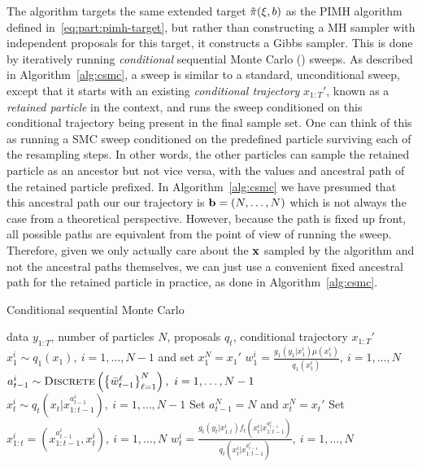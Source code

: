The \pg algorithm targets the same extended target $\tilde{\pi}(\mathbf{\xi},b)$ as the PIMH algorithm defined
in~\eqref{eq:part:pimh-target}, but rather than constructing a MH sampler with independent proposals for
this target, it constructs a Gibbs sampler.  This is done by iteratively 
running \emph{conditional} sequential Monte Carlo (\csmc) sweeps. As described in Algorithm~\ref{alg:csmc},
a \csmc sweep is similar to a standard, unconditional \smc sweep, except that it starts
with an existing \emph{conditional trajectory} $x_{1:T}'$, known as a \emph{retained particle} in the \pg
context, and runs the sweep conditioned on this conditional trajectory being present in the final sample
set.  One can think of this as running a SMC sweep conditioned on the predefined particle surviving each
of the resampling steps.  In other words, the other particles can sample the retained particle as an
ancestor but not vice versa, with the values and ancestral path of the retained particle prefixed. 
 In Algorithm~\ref{alg:csmc} we have
presumed  that this ancestral path our our trajectory is $\mathbf{b} = (N,\dots,N)$ which is not always the case from a theoretical
perspective.  However, because the path is fixed up front, all possible paths are equivalent from the point
of view of running the sweep.  Therefore,
given we only actually care about the $\mathbf{x}$ sampled by the algorithm and not the ancestral paths themselves,
we can just use a convenient fixed ancestral path for the retained particle in practice, as done in Algorithm~\ref{alg:csmc}.
\begin{algorithm}[tb]
	\caption{Conditional sequential Monte Carlo}
	\label{alg:csmc}
	\begin{spacing}{1.2}
		\begin{algorithmic}[1]
			\renewcommand{\algorithmicrequire}{\textbf{Inputs:}}
			\renewcommand{\algorithmicensure}{\textbf{Outputs:}}				 
			\Require data $y_{1:T}$, number of particles $N$, proposals $q_t$, conditional trajectory $x_{1:T}'$
			\State $x_1^i \sim q_1(x_1), ~i=1,\ldots,N-1$ and set $x_1^N = x_1'$
			\State $w_1^i = \frac{g_1(y_1|x_1^i) \mu(x_1^i)}{q_1(x_1^i)}, ~i=1,\ldots,N$
			\State $a_{t-1}^i \sim \operatorname*{\textsc{Discrete}}\left(\left\{\bar w_{t-1}^\ell\right\}_{\ell=1}^N\right), ~i=1,\ldots,N-1$
			\State $x_t^i \sim q_t(x_t | x_{1:t-1}^{a_{t-1}^i}), ~i=1,\ldots,N-1$
			\State Set $a_{t-1}^N = N$ and $x_t^N = x_t'$
			\State Set $x_{1:t}^i = (x_{1:t-1}^{a_{t-1}^i},x_t^i), ~i=1,\ldots,N$
			\State $w_t^i = \frac{g_t(y_t|x_{1:t}^i) f_t(x_t^i | x_{1:t-1}^{a_{t-1}^i})}{q_t(x_t^i|x_{1:t-1}^{a_{t-1}^i})}, ~i=1,\ldots,N$
			\EndFor
		\end{algorithmic}
	\end{spacing}
\end{algorithm}

